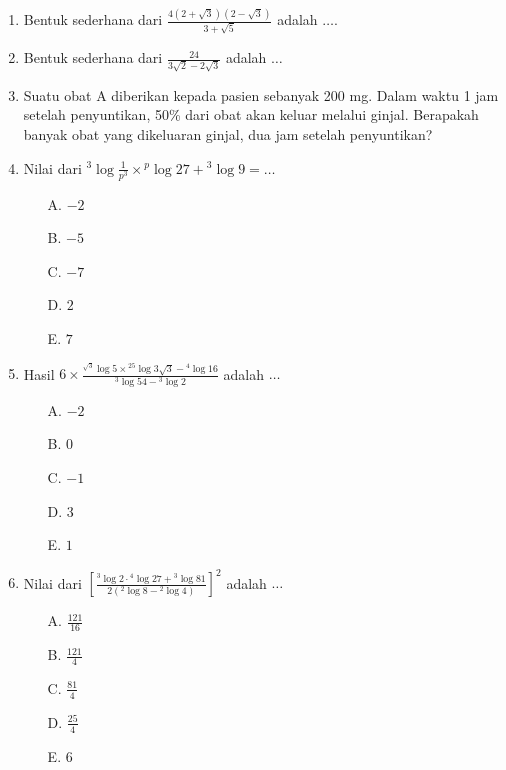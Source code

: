 \documentclass{article}
\begin{document}
\begin{enumerate}
    \item Bentuk sederhana dari $\displaystyle \frac{4(2+\sqrt{3})(2-\sqrt{3})}{3+\sqrt{5}}$ adalah $\dots$.

    \item Bentuk sederhana dari $\displaystyle \frac{24}{3\sqrt{2}-2\sqrt{3}}$ adalah $\dots$
    \item Suatu obat A diberikan kepada pasien sebanyak 200 mg. Dalam waktu 1 jam setelah penyuntikan, 50\% dari obat akan keluar melalui ginjal. Berapakah banyak obat yang dikeluaran ginjal, dua jam setelah penyuntikan?
    \item Nilai dari $\displaystyle {}^3 \log \frac{1}{p^3} \times {}^p \log 27 + {}^3 \log 9 = \dots$
    \begin{multicols}{3}
        \begin{enumerate}
            \item[A.] $-2$
            \item[B.] $-5$
            \item[C.] $-7$
            \item[D.] $2$
            \item[E.] $7$
        \end{enumerate}
    \end{multicols}

    \item Hasil $\displaystyle 6 \times \frac{{}^{\sqrt{3}} \log 5 \times {}^{25} \log 3 \sqrt{3} -{}^4 \log 16}{{}^3 \log 54 - {}^3 \log 2}$ adalah $\dots$
    \begin{multicols}{3}
        \begin{enumerate}
            \item[A.] $-2$
            \item[B.] $0$
            \item[C.] $-1$
            \item[D.] $3$
            \item[E.] $1$
        \end{enumerate}
    \end{multicols}
    \item Nilai dari $\displaystyle \left[ \frac{{}^3 \log 2 \cdot {}^4 \log 27 + {}^3 \log 81}{2\left({}^2 \log 8 - {}^2 \log 4\right)} \right]^2$ adalah $\dots$
    \begin{multicols}{3}
        \begin{enumerate}
            \item[A.] $\displaystyle \frac{121}{16}$
            \item[B.] $\displaystyle \frac{121}{4}$
            \item[C.] $\displaystyle \frac{81}{4}$
            \item[D.] $\displaystyle \frac{25}{4}$
            \item[E.] $6$
        \end{enumerate}
    \end{multicols}


\end{enumerate}
\end{document}
